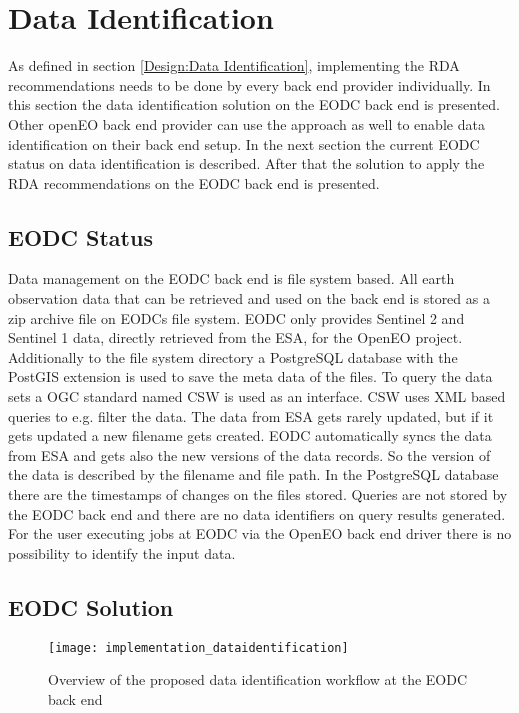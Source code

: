 \documentclass[draft,final]{vutinfth} %
\begin{document}
\section{Data Identification}\label{Implementation:Data Identification}
As defined in section \ref{Design:Data Identification}, implementing the RDA recommendations needs to be done by every back end provider individually. In this section the data identification solution on the EODC back end is presented. Other openEO back end provider can use the approach as well to enable data identification on their back end setup. 
In the next section the current EODC status on data identification is described. After that the solution to apply the RDA recommendations on the EODC back end is presented. 
  
\subsection{EODC Status}
Data management on the EODC back end is file system based. All earth observation data that can be retrieved and used on the back end is stored as a zip archive file on EODCs file system. EODC only provides Sentinel 2 and Sentinel 1 data, directly retrieved from the ESA, for the OpenEO project. Additionally to the file system directory a PostgreSQL database with the PostGIS extension is used to save the meta data of the files. To query the data sets a OGC standard named CSW is used as an interface. CSW uses XML based queries to e.g. filter the data. The data from ESA gets rarely updated, but if it gets updated a new filename gets created. EODC automatically syncs the data from ESA and gets also the new versions of the data records. So the version of the data is described by the filename and file path. In the PostgreSQL database there are the timestamps of changes on the files stored. Queries are not stored by the EODC back end and there are no data identifiers on query results generated. For the user executing jobs at EODC via the OpenEO back end driver there is no possibility to identify the input data.            

\subsection{EODC Solution}

 

\begin{figure}[h]
	\centering
	\texttt{[image: implementation\_dataidentification]}
	\caption{Overview of the proposed data identification workflow at the EODC back end}
	\label{fig:impldataid} %
\end{figure}
\end{document}
